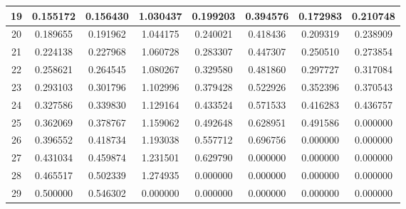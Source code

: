 \documentclass{article}
\begin{document}
\begin{table}[h!]
\begin{tabular}{|c|c|c|c|c|c|c|c|}
\hline
19&0.155172&0.156430&1.030437&0.199203&0.394576&0.172983&0.210748 \\ 
\hline
20&0.189655&0.191962&1.044175&0.240021&0.418436&0.209319&0.238909 \\ 
\hline
21&0.224138&0.227968&1.060728&0.283307&0.447307&0.250510&0.273854 \\ 
\hline
22&0.258621&0.264545&1.080267&0.329580&0.481860&0.297727&0.317084 \\ 
\hline
23&0.293103&0.301796&1.102996&0.379428&0.522926&0.352396&0.370543 \\ 
\hline
24&0.327586&0.339830&1.129164&0.433524&0.571533&0.416283&0.436757 \\ 
\hline
25&0.362069&0.378767&1.159062&0.492648&0.628951&0.491586&0.000000 \\ 
\hline
26&0.396552&0.418734&1.193038&0.557712&0.696756&0.000000&0.000000 \\ 
\hline
27&0.431034&0.459874&1.231501&0.629790&0.000000&0.000000&0.000000 \\ 
\hline
28&0.465517&0.502339&1.274935&0.000000&0.000000&0.000000&0.000000 \\ 
\hline
29&0.500000&0.546302&0.000000&0.000000&0.000000&0.000000&0.000000 \\ 
\hline
\end{tabular}
\end{table}
\end{document}
